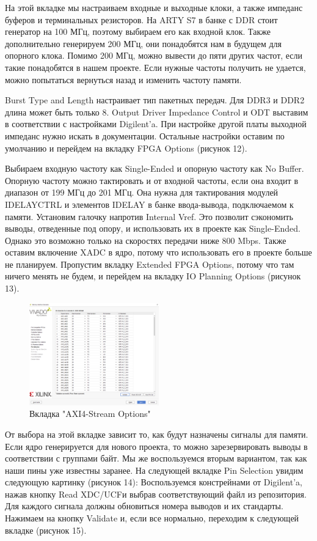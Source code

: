 \documentclass[a4paper,oneside ,14pt]{extreport}
\begin{document}
На этой вкладке мы настраиваем входные и выходные клоки, а также импеданс буферов и терминальных резисторов. На ARTY S7 в банке с DDR стоит генератор на 100 МГц, поэтому выбираем его как входной клок. Также дополнительно генерируем 200 МГц, они понадобятся нам в будущем для опорного клока. Помимо 200 МГц, можно вывести до пяти других частот, если такие понадобятся в нашем проекте. Если нужные частоты получить не удается, можно попытаться вернуться назад и изменить частоту памяти.

Burst Type and Length настраивает тип пакетных передач. Для DDR3 и DDR2 длина может быть только 8. Output Driver Impedance Control и ODT выставим в соответствии с настройками Digilent’a. При настройке другой платы выходной импеданс нужно искать в документации. Остальные настройки оставим по умолчанию и перейдем на вкладку FPGA Options (рисунок 12).
    
Выбираем входную частоту как Single-Ended и опорную частоту как No Buffer. Опорную частоту можно тактировать и от входной частоты, если она входит в диапазон от 199 МГц до 201 МГц. Она нужна для тактирования модулей IDELAYCTRL и элементов IDELAY в банке ввода-вывода, подключаемом к памяти. Установим галочку напротив Internal Vref. Это позволит сэкономить выводы, отведенные под опору, и использовать их в проекте как Single-Ended. Однако это возможно только на скоростях передачи ниже 800 Mbps. Также оставим включение XADC в ядро, потому что использовать его в проекте больше не планируем. Пропустим вкладку Extended FPGA Options, потому что там ничего менять не будем, и перейдем на вкладку IO Planning Options (рисунок 13).

\begin{figure}[h]
	\centering
	\includegraphics[width=0.5\textwidth]{image/mig_10.png}
	\caption{Вкладка "AXI4-Stream Options"}
	\label{cordic_axi4_stream_options}
\end{figure}
    
От выбора на этой вкладке зависит то, как будут назначены сигналы для памяти. Если ядро генерируется для нового проекта, то можно зарезервировать выводы в соответствии с группами байт. Мы же воспользуемся вторым вариантом, так как наши пины уже известны заранее. На следующей вкладке Pin Selection увидим следующую картинку (рисунок 14):
Воспользуемся констрейнами от Digilent’a, нажав кнопку Read XDC/UCFи выбрав соответствующий файл из репозитория. Для каждого сигнала должны обновиться номера выводов и их стандарты. Нажимаем на кнопку Validate и, если все нормально, переходим к следующей вкладке (рисунок 15).
\end{document}
